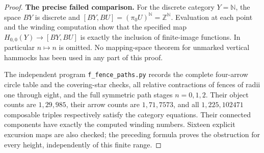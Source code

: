 \begin{proof}
\textbf{The precise failed comparison.}
For the discrete category $Y=\mathbb N$, the space $BY$ is discrete
and $[BY,BU]=(\pi_0U)^{\mathbb N}=\mathbb Z^{\mathbb N}$.
Evaluation at each point and the winding computation show that
the specified map $H_{0,0}(Y)\to[BY,BU]$ is exactly the inclusion
of finite-image functions. In particular $n\mapsto n$ is omitted.
No mapping-space theorem for unmarked vertical hammocks has been
used in any part of this proof.

The independent program \texttt{f\_fence\_paths.py} records the
complete four-arrow circle table and the covering-star checks,
all relative contractions of fences of radii one through eight,
and the full symmetric path stages $n=0,1,2$. Their object counts
are $1,29,985$, their arrow counts are $1,71,7573$, and all
$1,225,102471$ composable triples respectively satisfy the
category equations. Their connected components have exactly the
computed winding numbers. Sixteen explicit excursion maps are
also checked; the preceding formula proves the obstruction for
every height, independently of this finite range.
\end{proof}
